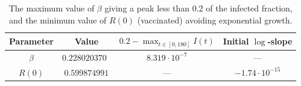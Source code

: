 \begin{table}[htb]
	\centering
	\caption{The maximum value of $\beta$ giving a peak less than $0.2$ of the infected fraction, and the minimum value of $R(0)$ (vaccinated) avoiding exponential growth.}
	\begin{tabular}{cccc}
		\toprule
		\textbf{Parameter} & \textbf{Value} & $0.2 - \max_{t\in[0,180]} I(t)$ & \textbf{Initial $\log$-slope} \\
		\midrule
		$\beta$ & $0.228020370$ & $8.319\cdot 10^{-7}$ & --- \\
		$R(0)$  & $0.599874991$ & --- & $-1.74\cdot 10^{-15}$ \\
		\bottomrule
	\end{tabular}
	\label{tab:2Acd}
\end{table}


\clearpage

